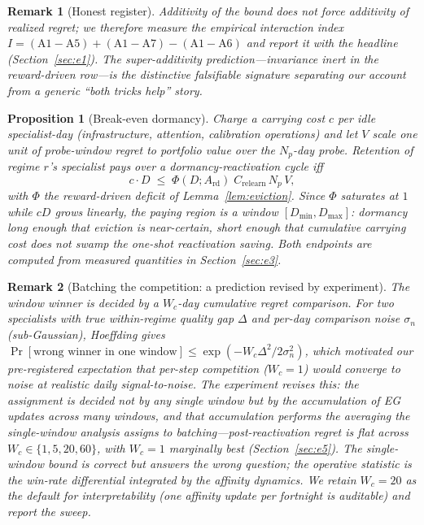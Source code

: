 \documentclass{article}
\newtheorem{proposition}{Proposition}
\newtheorem{remark}{Remark}
\begin{document}
\begin{remark}[Honest register]
Additivity of the \emph{bound} does not force additivity of realized
regret; we therefore measure the empirical interaction index
$I = (\text{A1} - \text{A5}) + (\text{A1} - \text{A7}) - (\text{A1} -
\text{A6})$ and report it with the headline (Section~\ref{sec:e1}). The
super-additivity prediction---invariance inert in the reward-driven
row---is the distinctive falsifiable signature separating our account from
a generic ``both tricks help'' story.
\end{remark}

\begin{proposition}[Break-even dormancy]
\label{prop:breakeven}
Charge a carrying cost $c$ per idle specialist-day (infrastructure,
attention, calibration operations) and let $V$ scale one unit of
probe-window regret to portfolio value over the $N_p$-day probe. Retention
of regime $r$'s specialist pays over a dormancy-reactivation cycle iff
\[
  c \cdot D \;\le\; \Phi(D; A_{\mathrm{rd}})\; C_{\mathrm{relearn}}\,
  N_p\, V,
\]
with $\Phi$ the reward-driven deficit of Lemma~\ref{lem:eviction}. Since
$\Phi$ saturates at $1$ while $cD$ grows linearly, the paying region is a
\emph{window} $[D_{\min}, D_{\max}]$: dormancy long enough that eviction is
near-certain, short enough that cumulative carrying cost does not swamp the
one-shot reactivation saving. Both endpoints are computed from measured
quantities in Section~\ref{sec:e3}.
\end{proposition}

\begin{remark}[Batching the competition: a prediction revised by experiment]
\label{rem:batching}
The window winner is decided by a $W_c$-day cumulative regret comparison.
For two specialists with true within-regime quality gap $\Delta$ and
per-day comparison noise $\sigma_n$ (sub-Gaussian), Hoeffding gives
$\Pr[\text{wrong winner in one window}] \le \exp(-W_c \Delta^2 /
2\sigma_n^2)$, which motivated our pre-registered expectation that per-step
competition ($W_c = 1$) would converge to noise at realistic daily
signal-to-noise. The experiment revises this: the assignment is decided not
by any single window but by the \emph{accumulation} of EG updates across
many windows, and that accumulation performs the averaging the single-window
analysis assigns to batching---post-reactivation regret is flat across
$W_c \in \{1, 5, 20, 60\}$, with $W_c = 1$ marginally best
(Section~\ref{sec:e5}). The single-window bound is correct but answers the
wrong question; the operative statistic is the win-rate differential
integrated by the affinity dynamics. We retain $W_c = 20$ as the default for
interpretability (one affinity update per fortnight is auditable) and
report the sweep.
\end{remark}
\end{document}
